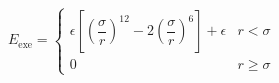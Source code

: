 \documentclass[12pt]{article}
\begin{document}
$$
E_{\text{exe}} = 
 \begin{cases}
  \epsilon \left[ \left( \dfrac{\sigma}{r}\right)^{12} - 2 \left(\dfrac{\sigma}{r}\right)^6\right] + \epsilon & r < \sigma \\
   0 & r \geq \sigma
    \end{cases}
$$
\end{document}
